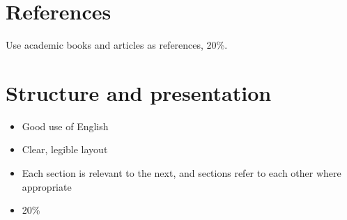 \documentclass[aip,apl,reprint]{revtex4-1}
\begin{document}
	\section{References}
	Use academic books and articles as references, 20\%.
	
	\section{Structure and presentation}
	\begin{itemize}
		\item Good use of English
		\item Clear, legible layout
		\item Each section is relevant to the next, and sections refer to each other where appropriate
		\item 20\%
	\end{itemize}
	
\end{document}
